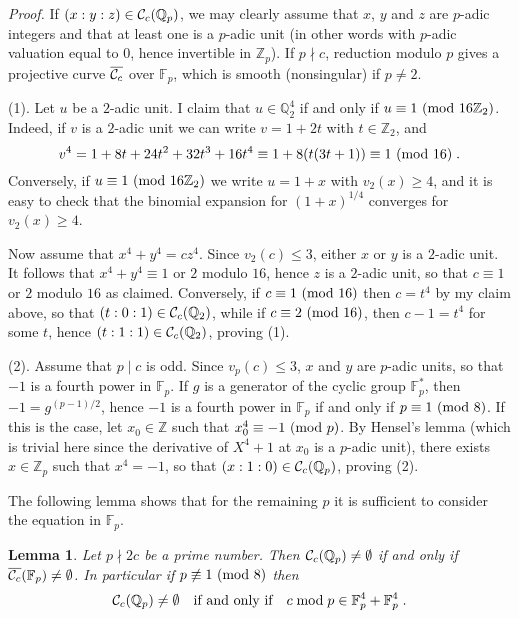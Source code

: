 \documentclass[12pt,a4paper]{article}
\newcommand{\ov}[1]{\overline{\vphantom{T}#1}}
\newcommand{\Q}{{\mathbb Q}}
\newcommand{\Z}{{\mathbb Z}}
\newcommand{\F}{{\mathbb F}}
\newcommand{\CC}{{\cal C}}
\newcommand{\Proof}{{\it Proof. \/}}
\newtheorem{lemma}[theorem]{Lemma}
\renewcommand{\pmod}[1]{\allowbreak\ ({\rm{mod}}\,\,#1)}
\begin{document}
\Proof If $(x:y:z)\in \CC_c(\Q_p)$, we may clearly assume that $x$, $y$ and 
$z$ are $p$-adic integers and that at least one is a $p$-adic unit (in
other words with $p$-adic valuation equal to $0$, hence invertible in $\Z_p$).
If $p\nmid c$, reduction modulo $p$ gives a projective curve $\ov{\CC_c}$ over 
$\F_p$, which is smooth (nonsingular) if $p\neq2$.

\smallskip

(1). Let $u$ be a $2$-adic unit. I claim that $u\in\Q_2^4$ if and only if
$u\equiv1\pmod{16\Z_2}$. Indeed, if $v$ is a $2$-adic unit we can write
$v=1+2t$ with $t\in\Z_2$, and 
$$v^4=1+8t+24t^2+32t^3+16t^4\equiv1+8(t(3t+1))\equiv1\pmod{16}\;.$$
Conversely, if $u\equiv1\pmod{16\Z_2}$ we write $u=1+x$ with $v_2(x)\ge4$,
and it is easy to check that the binomial expansion for $(1+x)^{1/4}$ converges
for $v_2(x)\ge4$.

Now assume that $x^4+y^4=cz^4$. Since $v_2(c)\le3$, either $x$ or $y$ is
a $2$-adic unit. It follows that $x^4+y^4\equiv1$ or $2$ modulo $16$, hence
$z$ is a $2$-adic unit, so that $c\equiv1$ or $2$ modulo $16$ as claimed.
Conversely, if $c\equiv1\pmod{16}$ then $c=t^4$ by my claim above, so that
$(t:0:1)\in \CC_c(\Q_2)$, while if $c\equiv2\pmod{16}$, then $c-1=t^4$ for some
$t$, hence $(t:1:1)\in \CC_c(\Q_2)$, proving (1).

\smallskip

(2). Assume that $p\mid c$ is odd. Since $v_p(c)\le3$, $x$ and $y$ are 
$p$-adic units, so that $-1$ is a fourth power in $\F_p$. If $g$ is a generator
of the cyclic group $\F_p^*$, then $-1=g^{(p-1)/2}$, hence $-1$ is a fourth
power in $\F_p$ if and only if $p\equiv1\pmod8$. If this is the case, let
$x_0\in\Z$ such that $x_0^4\equiv-1\pmod{p}$. By Hensel's lemma (which is
trivial here since the derivative of $X^4+1$ at $x_0$ is a $p$-adic unit),
there exists $x\in\Z_p$ such that $x^4=-1$, so that $(x:1:0)\in \CC_c(\Q_p)$,
proving (2).

\smallskip

The following lemma shows that for the remaining $p$ it is sufficient to
consider the equation in $\F_p$.

\begin{lemma} Let $p\nmid 2c$ be a prime number. Then 
$\CC_c(\Q_p)\neq\emptyset$
if and only if $\ov{\CC_c}(\F_p)\neq\emptyset$. In particular if 
$p\not\equiv1\pmod8$ then 
$$\CC_c(\Q_p)\neq\emptyset\text{\quad if and only if\quad}c\bmod p\in\F_p^4+\F_p^4\;.$$
\end{lemma}
\end{document}
